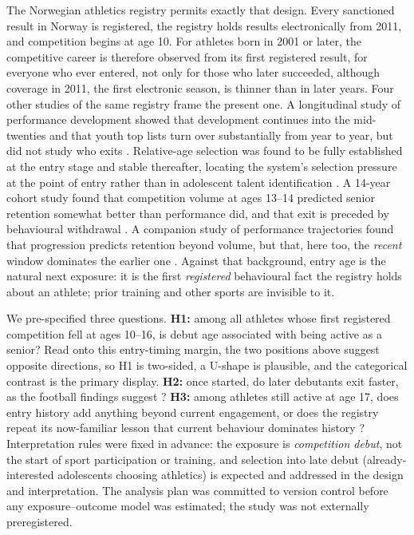 \documentclass[12pt,a4paper]{article}
\begin{document}
The Norwegian athletics registry permits exactly that design. Every sanctioned result in Norway is registered, the registry holds results electronically from 2011, and competition begins at age 10. For athletes born in 2001 or later, the competitive career is therefore observed from its first registered result, for everyone who ever entered, not only for those who later succeeded, although coverage in 2011, the first electronic season, is thinner than in later years. Four other studies of the same registry frame the present one. A longitudinal study of performance development showed that development continues into the mid-twenties and that youth top lists turn over substantially from year to year, but did not study who exits \cite{guttormsen2026development}. Relative-age selection was found to be fully established at the entry stage and stable thereafter, locating the system's selection pressure at the point of entry rather than in adolescent talent identification \cite{guttormsen2026rae}. A 14-year cohort study found that competition volume at ages 13--14 predicted senior retention somewhat better than performance did, and that exit is preceded by behavioural withdrawal \cite{guttormsen2026dropout}. A companion study of performance trajectories found that progression predicts retention beyond volume, but that, here too, the \emph{recent} window dominates the earlier one \cite{guttormsen2026progression}. Against that background, entry age is the natural next exposure: it is the first \emph{registered} behavioural fact the registry holds about an athlete; prior training and other sports are invisible to it.

We pre-specified three questions. \textbf{H1:} among all athletes whose first registered competition fell at ages 10--16, is debut age associated with being active as a senior? Read onto this entry-timing margin, the two positions above suggest opposite directions, so H1 is two-sided, a U-shape is plausible, and the categorical contrast is the primary display. \textbf{H2:} once started, do later debutants exit faster, as the football findings suggest \cite{vanyperen2021}? \textbf{H3:} among athletes still active at age 17, does entry history add anything beyond current engagement, or does the registry repeat its now-familiar lesson that current behaviour dominates history \cite{guttormsen2026dropout,guttormsen2026progression}? Interpretation rules were fixed in advance: the exposure is \emph{competition debut}, not the start of sport participation or training, and selection into late debut (already-interested adolescents choosing athletics) is expected and addressed in the design and interpretation. The analysis plan was committed to version control before any exposure--outcome model was estimated; the study was not externally preregistered.
\end{document}
